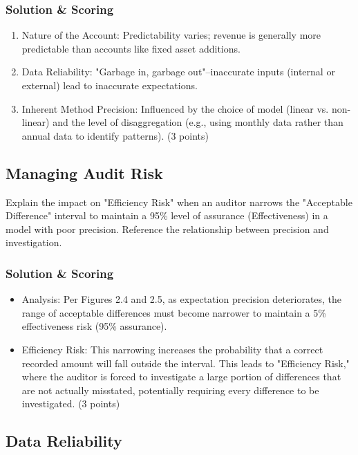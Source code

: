 \documentclass[12pt,a4paper]{memoir}
\begin{document}
\subsubsection{Solution \& Scoring}
\begin{enumerate}
\item Nature of the Account: Predictability varies; revenue is generally more predictable than accounts like fixed asset additions.
\item Data Reliability: "Garbage in, garbage out"--inaccurate inputs (internal or external) lead to inaccurate expectations.
\item Inherent Method Precision: Influenced by the choice of model (linear vs. non-linear) and the level of disaggregation (e.g., using monthly data rather than annual data to identify patterns). (3 points)
\end{enumerate}

\subsection{Managing Audit Risk}

Explain the impact on "Efficiency Risk" when an auditor narrows the "Acceptable Difference" interval to maintain a 95\% level of assurance (Effectiveness) in a model with poor precision. Reference the relationship between precision and investigation.

\subsubsection{Solution \& Scoring}
\begin{itemize}
\item Analysis: Per Figures 2.4 and 2.5, as expectation precision deteriorates, the range of acceptable differences must become narrower to maintain a 5\% effectiveness risk (95\% assurance).
\item Efficiency Risk: This narrowing increases the probability that a correct recorded amount will fall outside the interval. This leads to "Efficiency Risk," where the auditor is forced to investigate a large portion of differences that are not actually misstated, potentially requiring every difference to be investigated. (3 points)
\end{itemize}

\subsection{Data Reliability}
\end{document}
